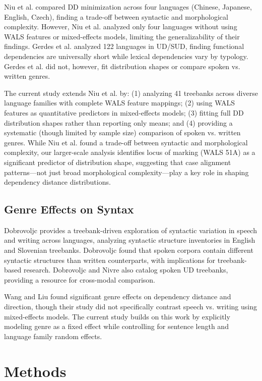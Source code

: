 \documentclass[11pt,letterpaper]{article}
\begin{document}
Niu et al. \cite{Niu2023} compared DD minimization across four languages (Chinese, Japanese, English, Czech), finding a trade-off between syntactic and morphological complexity. However, Niu et al. analyzed only four languages without using WALS features or mixed-effects models, limiting the generalizability of their findings. Gerdes et al. \cite{Gerdes2026} analyzed 122 languages in UD/SUD, finding functional dependencies are universally short while lexical dependencies vary by typology. Gerdes et al. did not, however, fit distribution shapes or compare spoken vs. written genres.

The current study extends Niu et al. \cite{Niu2023} by: (1) analyzing 41 treebanks across diverse language families with complete WALS feature mappings; (2) using WALS features as quantitative predictors in mixed-effects models; (3) fitting full DD distribution shapes rather than reporting only means; and (4) providing a systematic (though limited by sample size) comparison of spoken vs. written genres. While Niu et al. found a trade-off between syntactic and morphological complexity, our larger-scale analysis identifies locus of marking (WALS 51A) as a significant predictor of distribution shape, suggesting that case alignment patterns---not just broad morphological complexity---play a key role in shaping dependency distance distributions.

\subsection{Genre Effects on Syntax}

Dobrovoljc \cite{Dobrovoljc2025} provides a treebank-driven exploration of syntactic variation in speech and writing across languages, analyzing syntactic structure inventories in English and Slovenian treebanks. Dobrovoljc found that spoken corpora contain different syntactic structures than written counterparts, with implications for treebank-based research. Dobrovoljc and Nivre \cite{Dobrovoljc2022} also catalog spoken UD treebanks, providing a resource for cross-modal comparison.

Wang and Liu \cite{Wang2017} found significant genre effects on dependency distance and direction, though their study did not specifically contrast speech vs. writing using mixed-effects models. The current study builds on this work by explicitly modeling genre as a fixed effect while controlling for sentence length and language family random effects.

\section{Methods}
\end{document}
